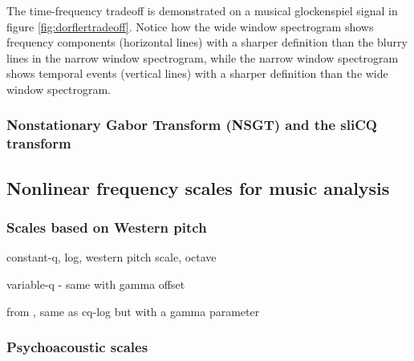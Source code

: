\documentclass[report.tex]{subfiles}
\begin{document}
The time-frequency tradeoff is demonstrated on a musical glockenspiel signal in figure \ref{fig:dorflertradeoff}. Notice how the wide window spectrogram shows frequency components (horizontal lines) with a sharper definition than the blurry lines in the narrow window spectrogram, while the narrow window spectrogram shows temporal events (vertical lines) with a sharper definition than the wide window spectrogram.

\subsubsection{Nonstationary Gabor Transform (NSGT) and the sliCQ transform}
\label{sec:theorynsgt}






\newpagefill

\subsection{Nonlinear frequency scales for music analysis}
\label{sec:freqscales}


\subsubsection{Scales based on Western pitch}

constant-q, log, western pitch scale, octave

variable-q - same with gamma offset

from \cite{variableq1, variableq2}, same as cq-log but with a gamma parameter

\subsubsection{Psychoacoustic scales}
\end{document}
